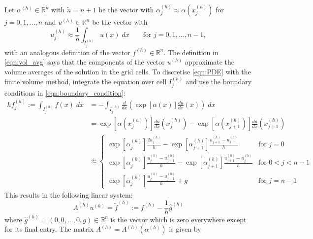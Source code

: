 \documentclass[11pt]{article}
\begin{document}
Let $\alpha^{(h)}\in\mathbb{R}^{\widetilde{n}}$ with $\widetilde{n}=n+1$ be the vector with $\alpha^{(h)}_j\approx \alpha(x^{(h)}_j)$ for $j=0,1,\dots,n$ and $u^{(h)}\in\mathbb{R}^{n}$ be the vector with
\begin{equation}
    u^{(h)}_j\approx \frac{1}{h}\int_{I^{(h)}_j} u(x)\; dx\qquad\text{for $j=0,1,\dots,n-1$},\label{eqn:vol_avg}
\end{equation}
with an analogous definition of the vector $f^{(h)}\in \mathbb{R}^n$. The definition in \eqref{eqn:vol_avg} says that the components of the vector $u^{(h)}$ approximate the volume averages of the solution in the grid cells. To discretise \eqref{eqn:PDE} with the finite volume method, integrate the equation over cell $I_j^{(h)}$ and use the boundary conditions in \eqref{eqn:boundary_condition}:
\begin{equation}
    \begin{aligned}
       hf^{(h)}_j :=\int_{I^{(h)}_j} f(x)\;dx&=
    -\int_{I^{(h)}_j} \frac{d}{dx}\left(\exp[\alpha(x)]\frac{du}{dx}(x)\right)\;dx \\
    &=\exp[\alpha(x^{(h)}_{j})]\frac{du}{dx}(x^{(h)}_{j})-\exp[\alpha(x^{(h)}_{j+1})]\frac{du}{dx}(x^{(h)}_{j+1})\\
    &\approx \begin{cases}
        \exp[\alpha^{(h)}_{j}]\frac{2u^{(h)}_j}{h}-\exp[\alpha^{(h)}_{j+1}]\frac{u^{(h)}_{j+1}-u^{(h)}_j}{h}&\text{for $j=0$}\\
        \exp[\alpha^{(h)}_{j}]\frac{u^{(h)}_j-u^{(h)}_{j-1}}{h}-\exp[\alpha^{(h)}_{j+1}]\frac{u^{(h)}_{j+1}-u^{(h)}_j}{h}&\text{for $0<j<n-1$}\\ 
        \exp[\alpha^{(h)}_{j}]\frac{u^{(h)}_j-u^{(h)}_{j-1}}{h}+g&\text{for $j=n-1$}
    \end{cases}
    \end{aligned}  
\end{equation}
This results in the following linear system:
\begin{equation}
A^{(h)} u^{(h)} = \widetilde{f}^{(h)} := f^{(h)}-\frac{1}{h}\widehat{g}^{(h)} \label{eqn:discrete_system}
\end{equation}
where $\widehat{g}^{(h)}=(0,0,\dots,0,g)\in\mathbb{R}^{n}$ is the vector which is zero everywhere except for its final entry. The matrix $A^{(h)} = A^{(h)}(\alpha^{(h)})$ is given by
\end{document}
